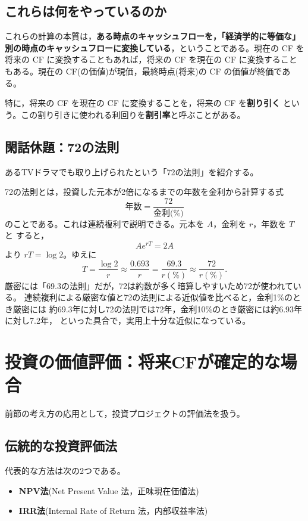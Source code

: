 \subsection{これらは何をやっているのか}

これらの計算の本質は，\textbf{ある時点のキャッシュフローを，「経済学的に等価な」
別の時点のキャッシュフローに変換している}，ということである。現在の CF を将来の
CF に変換することもあれば，将来の CF を現在の CF に変換することもある。現在の
CF(の価値)が現価，最終時点(将来)の CF の価値が終価である。

特に，将来の CF を現在の CF に変換することを，将来の CF を\textbf{割り引く}
という。この割り引きに使われる利回りを\textbf{割引率}と呼ぶことがある。

\subsection*{閑話休題：72の法則}

あるTVドラマでも取り上げられたという「72の法則」を紹介する。

72の法則とは，投資した元本が2倍になるまでの年数を金利から計算する式
\[
\text{年数} = \frac{72}{\text{金利(\%)}}
\]
のことである。これは連続複利で説明できる。元本を $A$，金利を $r$，年数を $T$ と
すると，
\[
A e^{rT} = 2A
\]
より $rT = \log 2$。ゆえに
\[
T = \frac{\log 2}{r} \approx \frac{0.693}{r} = \frac{69.3}{r(\%)}
\approx \frac{72}{r(\%)}.
\]
厳密には「69.3の法則」だが，72は約数が多く暗算しやすいため72が使われている。
連続複利による厳密な値と72の法則による近似値を比べると，金利1\%のとき厳密には
約69.3年に対し72の法則では72年，金利10\%のとき厳密には約6.93年に対し7.2年，
といった具合で，実用上十分な近似になっている。

\section{投資の価値評価：将来CFが確定的な場合}

前節の考え方の応用として，投資プロジェクトの評価法を扱う。

\subsection{伝統的な投資評価法}

代表的な方法は次の2つである。
\begin{itemize}
\item \textbf{NPV法}(Net Present Value 法，正味現在価値法)
\item \textbf{IRR法}(Internal Rate of Return 法，内部収益率法)
\end{itemize}

